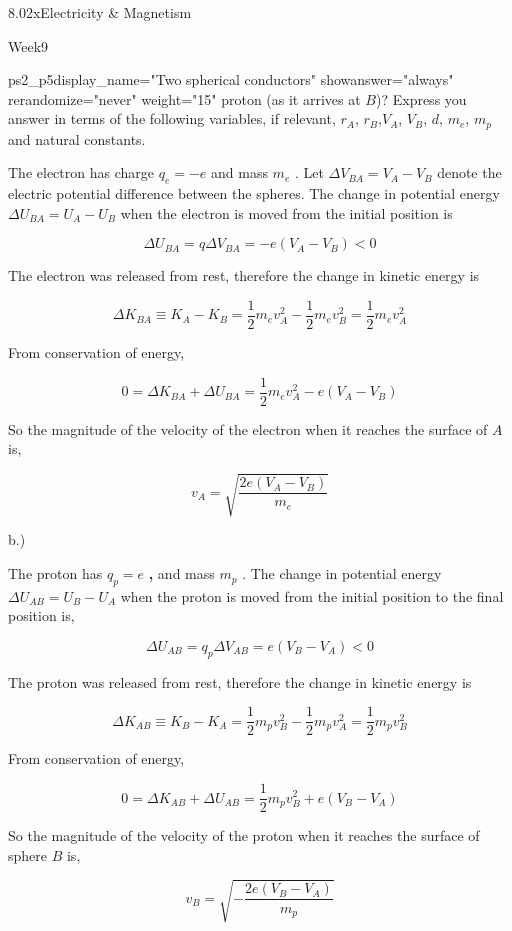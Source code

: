 \documentclass[12pt]{article}
\begin{document}
\begin{edXcourse}{8.02x}{Electricity \& Magnetism}
\begin{edXchapter}{Week9}
\begin{edXsequential}
\begin{edXproblem}{ps2_p5}{display_name="Two spherical conductors" showanswer="always" rerandomize="never" weight="15"}
proton (as it arrives at $B$)? Express you answer in terms of the following variables,
if relevant, $r_A$, $r_B$,$V_A$, $V_B$, $d$, $m_e$, $m_p$ and natural
constants.


\begin{edXsolution}
The electron has charge $q_{e} =-e $ \textbf{ }and mass $m_{e}  $ .\textbf{ }Let 
 $\Delta V_{BA} =V_{A} -V_{B}  $  denote the electric potential
 difference between the 
spheres. The change in potential energy $\Delta U_{BA} =U_{A} -U_{B}  $  
when the electron is moved from the initial position is

$$\Delta U_{BA} =q\Delta V_{BA} =-e(V_{A} -V_{B} )<0 $$

The electron was released from rest, therefore the change in kinetic energy is 

$$\Delta K_{BA} \equiv K_{A} -K_{B} =\frac{1}{2} m_{e} v_{A}^{2} -\frac{1}{2} m_{e} v_{B}^{2} =\frac{1}{2} m_{e} v_{A}^{2}  $$
 

From conservation of energy, 

$$0=\Delta K_{BA} +\Delta U_{BA} =\frac{1}{2} m_{e} v_{A}^{2} -e(V_{A} -V_{B} ) $$

So the magnitude of the velocity of the electron when it reaches the
surface of $A$
is, 

$$v_{A} =\sqrt{\frac{2e(V_{A} -V_{B} )}{m_{e} } }  $$

b.)

The proton has $q_{p} =e $ \textbf{, }and mass\textbf{ $m_{p}  $ }. The change 
in potential energy $\Delta U_{AB} =U_{B} -U_{A}  $  when the proton is moved from 
the initial position   to the final position  is, 

$$\Delta U_{AB} =q_{p} \Delta V_{AB} =e(V_{B} -V_{A} )<0 $$

The proton was released from rest, therefore the change in kinetic energy is 

$$\Delta K_{AB} \equiv K_{B} -K_{A} =\frac{1}{2} m_{p} v_{B}^{2} -\frac{1}{2} m_{p} v_{A}^{2} =\frac{1}{2} m_{p} v_{B}^{2}  $$
 

From conservation of energy, 

$$0=\Delta K_{AB} +\Delta U_{AB} =\frac{1}{2} m_{p} v_{B}^{2} +e(V_{B} -V_{A} ) $$

So the magnitude of the velocity of the proton when it reaches the
surface of sphere $B$
is, 

$$v_{B} =\sqrt{-\frac{2e(V_{B} -V_{A} )}{m_{p} } }  $$


\end{edXsolution}
\end{edXproblem}
\end{edXsequential}
\end{edXchapter}
\end{edXcourse}
\end{document}
